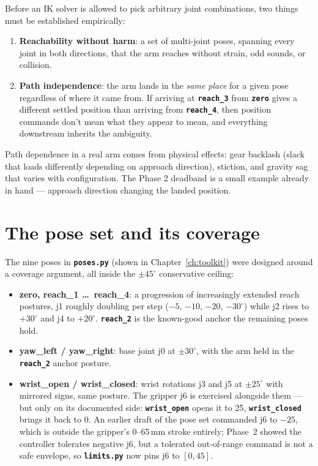 \documentclass[11pt,twoside,openright]{book}
\newcommand{\code}[1]{\texttt{\bfseries #1}}
\begin{document}
Before an IK solver is allowed to pick arbitrary joint combinations, two
things must be established empirically:

\begin{enumerate}
  \item \textbf{Reachability without harm}: a set of multi-joint poses,
    spanning every joint in both directions, that the arm reaches without
    strain, odd sounds, or collision.
  \item \textbf{Path independence}: the arm lands in the \emph{same
    place} for a given pose regardless of where it came from. If arriving
    at \code{reach\_3} from \code{zero} gives a different settled position
    than arriving from \code{reach\_4}, then position commands don't mean
    what they appear to mean, and everything downstream inherits the
    ambiguity.
\end{enumerate}

Path dependence in a real arm comes from physical effects: gear backlash
(slack that loads differently depending on approach direction), stiction,
and gravity sag that varies with configuration. The Phase 2 deadband is a
small example already in hand --- approach direction changing the landed
position.

\section{The pose set and its coverage}

The nine poses in \code{poses.py} (shown in Chapter~\ref{ch:toolkit}) were designed
around a coverage argument, all inside the $\pm45^\circ$ conservative
ceiling:

\begin{itemize}
  \item \textbf{zero, reach\_1 \ldots\ reach\_4}: a progression of
    increasingly extended reach postures, j1 roughly doubling per step
    ($-5$, $-10$, $-20$, $-30^\circ$) while j2 rises to $+30^\circ$ and
    j4 to $+20^\circ$. \code{reach\_2} is the known-good anchor the
    remaining poses hold.
  \item \textbf{yaw\_left / yaw\_right}: base joint j0 at $\pm30^\circ$,
    with the arm held in the \code{reach\_2} anchor posture.
  \item \textbf{wrist\_open / wrist\_closed}: wrist rotations j3 and j5 at
    $\pm25^\circ$ with mirrored signs, same posture. The gripper j6
    is exercised alongside them --- but only on its documented side:
    \code{wrist\_open} opens it to 25, \code{wrist\_closed} brings it back
    to 0. An earlier draft of the pose set commanded j6 to $-25$, which
    is outside the gripper's 0--65\,mm stroke entirely; Phase~2 showed
    the controller tolerates negative j6, but a tolerated
    out-of-range command is not a safe envelope, so
    \code{limits.py} now pins j6 to $[0, 45]$.
\end{itemize}
\end{document}
